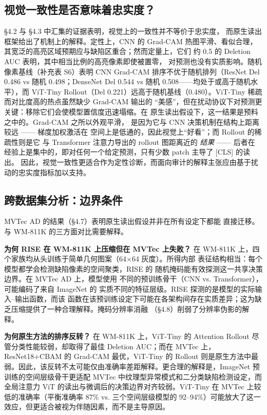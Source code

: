 \documentclass[11pt,a4paper]{article}
\begin{document}
\subsection{视觉一致性是否意味着忠实度？}

§4.2 与 §4.3 中汇集的证据表明，视觉上的一致性并不等价于忠实度， 而原生读出框架给出了机制上的解释。定性上，CNN 的 Grad-CAM 热图平滑、看似合理，其宽泛的高亮区域预期应与缺陷区重合；然而定量上，它们 约 0.5 的 Deletion AUC 表明，其中相当比例的高亮像素即使被置零， 对预测也没有实质影响。随机像素基线（补充表 S6）表明 CNN Grad-CAM 排序不优于随机排列（ResNet Del 0.486 vs 随机 0.498；DenseNet Del 0.544 vs 随机 0.508——均处于或高于随机水平），而 ViT-Tiny Rollout（Del 0.221）远高于随机基线（0.480）。ViT-Tiny 稀疏而对比度高的热点虽然缺少 Grad-CAM 输出的 “美感”，但在扰动协议下对预测更关键：移除它们会使模型置信度迅速塌缩。在 原生读出假设下，这一结果是预料之中的。Grad-CAM 之所以外观平滑， 是因为它与 CNN 决策机制在结构上距离较远 —— 梯度加权激活在 空间上是低通的，因此视觉上“好看”；而 Rollout 的稀疏性则是它 与 Transformer 注意力导出的 rollout 图距离近的 \emph{结果} —— 后者在 经验上是集中的，即对任何一个给定预测，只有少数 patch 主导了 [CLS] 的读出。 因此，视觉一致性更适合作为定性诊断，而面向审计的解释主张应由基于扰动的忠实度指标加以支持。

\subsection{跨数据集分析：边界条件}

MVTec AD 的结果（§4.7）表明原生读出假设并非在所有设定下都能 直接迁移。与 WM-811K 的三方面对比需要解释。

\textbf{为何 RISE 在 WM-811K 上压缩但在 MVTec 上失败？} 在 WM-811K 上，四个家族均从头训练于简单几何图案（64×64 灰度）。所得内部 表征结构相当：每个模型都学会检测缺陷像素的空间聚类，RISE 的 随机掩码能有效探测这一共享决策边界。在 MVTec AD 上，模型使用 不同的预训练骨干（CNN vs. Transformer），可能编码了来自 ImageNet 的 实质不同的特征层级。RISE 探测的是模型的实际输入–输出函数，而该 函数在该预训练设定下可能在各架构间存在实质差异；这为缺乏压缩提供了一种合理解释。掩码分辨率消融 （§4.8）削弱了分辨率伪影的解释。

\textbf{为何原生方法的排序反转？} 在 WM-811K 上，ViT-Tiny 的 Attention Rollout 尽管分类性能较弱，却取得了最佳 Deletion AUC；而在 MVTec 上，ResNet18+CBAM 的 Grad-CAM 最优，ViT-Tiny 的 Rollout 则是原生方法中最弱。因此，该反转不太可能仅由准确率差距解释。更合理的解释是，ImageNet 预训练的空间层级骨干更适配 MVTec 中纹理型异常模式和二分类缺陷检测设定，而全局注意力 ViT 的读出与微调后的决策边界对齐较弱。ViT-Tiny 在 MVTec 上较低的准确率（平衡准确率 87\% vs. 三个空间层级模型的 92--94\%）可能放大了这一效应，但更适合被视为伴随因素，而不是主导原因。
\end{document}
